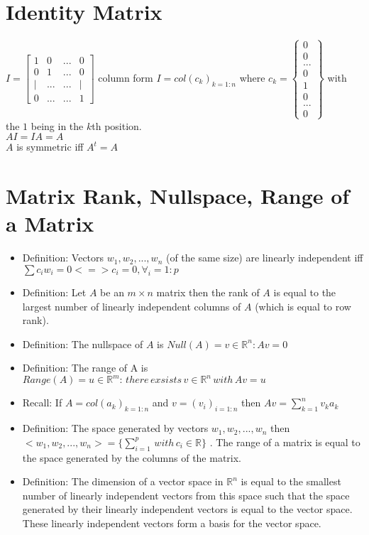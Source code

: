 \documentclass[12pt]{article}
\begin{document}
\section{Identity Matrix}
$I = \begin{bmatrix}
	1 & 0 & ... & 0 \\
	0 & 1 & ... & 0 \\
	| & ...  & ... & | \\
	0 & ... & ... & 1
\end{bmatrix}$ column form $I=col(c_k)_{k=1:n}$ where $c_k = \begin{Bmatrix}
	0 \\ 0 \\ ... \\ 0 \\ 1 \\ 0 \\ ... \\ 0
\end{Bmatrix}$ with the $1$ being in the $k$th position.  \\
$AI=IA=A$ \\
$A$ is symmetric iff $A^t=A$

\section{Matrix Rank, Nullspace, Range of a Matrix}
\begin{itemize}
	\item Definition: Vectors $w_1,w_2,...,w_n$ (of the same size) are linearly independent iff $\sum c_iw_i = 0 <=> c_i =0, \forall_i = 1:p$
	\item Definition: Let $A$ be an $m\times n$ matrix then the rank of $A$ is equal to the largest number of linearly independent columns of $A$ (which is equal to row rank).
	\item Definition: The nullspace of $A$ is $Null(A)={v\in \mathbb{R}^n:Av=0}$
	\item Definition: The range of A is $Range(A)={u\in\mathbb{R}^m:\, there\, exsists\, v\in\mathbb{R}^n\, with\, Av=u}$
	\item Recall: If $A = col(a_k)_{k=1:n}$ and $v=(v_i)_{i=1:n}$ then $Av=\sum_{k=1}^{n}v_ka_k$
	\item Definition: The space generated by vectors $w_1,w_2,...,w_n$  then  $<w_1,w_2,...,w_n>=\{\sum_{i=1}^{p}\, with\, c_i\in\mathbb{R}\}$ . The range of a matrix is equal to the space generated by the columns of the matrix.
	\item Definition: The dimension of a vector space in $\mathbb{R}^n$ is equal to the smallest number of linearly independent vectors from this space such that the space generated by their linearly independent vectors is equal to the vector space. These linearly independent vectors form a basis for the vector space.
\end{itemize}
\end{document}
